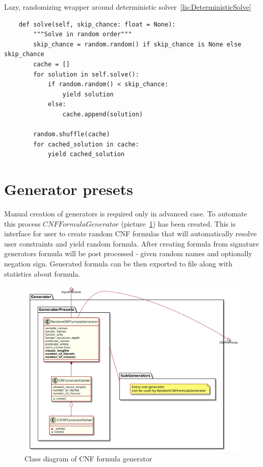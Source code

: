 \begin{listing}[H]
  \caption{Lazy, randomizing wrapper around deterministic solver~\ref{lis:DeterministicSolve}}
  \label{lis:RandomSolve}
\begin{verbatim}
    def solve(self, skip_chance: float = None):
        """Solve in random order"""
        skip_chance = random.random() if skip_chance is None else skip_chance
        cache = []
        for solution in self.solve():
            if random.random() < skip_chance:
                yield solution
            else:
                cache.append(solution)

        random.shuffle(cache)
        for cached_solution in cache:
            yield cached_solution
\end{verbatim}
\end{listing}

\section{Generator presets}

Manual creation of generators is required only in advanced case. To automate this process $CNFFormulaGenerator$ (picture~\ref{pic:cnf_generator_class_diagram}) has been created. This is interface for user to create random CNF formulas that will automatically resolve user constraints and yield random formula. After creating formula from signature generators formula will be post processed - given random names and optionally negation sign. Generated formula can be then exported to file along with statistics about formula.

\begin{figure}[h]
\begin{centering}
  \includegraphics[width=\textwidth]{logic-formula-generator/cnf_formula_generator.png}
  \caption{Class diagram of CNF formula generator}
  \label{pic:cnf_generator_class_diagram}
\end{centering}
\end{figure}


